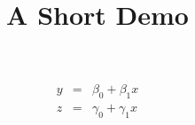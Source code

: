 \documentclass[article]{jss}
\title{A Short Demo}
\begin{document}
\begin{eqnarray}
y &=& \beta_0 + \beta_1 x \\
z &=& \gamma_0 + \gamma_1 x
\end{eqnarray}
\end{document}
